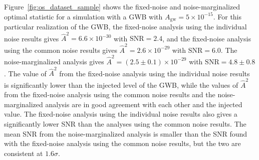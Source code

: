 \documentclass[twocolumn,aps,prd,superscriptaddress]{revtex4-1}
\newcommand{\Agw}{\ensuremath{A_\mathrm{gw}}}
\begin{document}
Figure~\ref{fig:os_dataset_sample} shows the fixed-noise and noise-marginalized 
optimal statistic for a simulation with a GWB with $\Agw=5\times10^{-15}$. 
For this particular realization of the GWB, 
the fixed-noise analysis 
using the individual noise results gives 
$\hat{A}^2 = 6.6\times10^{-30}$ with $\mathrm{SNR} = 2.4$, 
and the fixed-noise analysis using the common noise results gives 
$\hat{A}^2 = 2.6\times10^{-29}$ with $\mathrm{SNR} = 6.0$. 
The noise-marginalized analysis gives $\hat{A}^2 = (2.5 \pm 0.1)\times10^{-29}$ 
with $\mathrm{SNR}=4.8\pm0.8$. 
The value of $\hat{A}^2$ from the fixed-noise analysis using the individual noise results 
is significantly lower than the injected level of the GWB, while 
the values of $\hat{A}^2$ from the fixed-noise analysis using the common noise results 
and the noise-marginalized analysis are in good agreement with each other and the injected value. 
The fixed-noise analysis using the individual noise results also gives a significantly lower SNR 
than the analyses using the common noise results. 
The mean SNR from the noise-marginalized analysis is smaller 
than the SNR found with the fixed-noise analysis using the common noise results, 
but the two are consistent at $1.6\sigma$.
\end{document}
